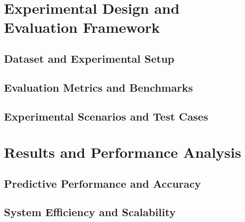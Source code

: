 \section{Experimental Design and Evaluation Framework}

\subsection{Dataset and Experimental Setup}

\subsection{Evaluation Metrics and Benchmarks}

\subsection{Experimental Scenarios and Test Cases}

\section{Results and Performance Analysis}

\subsection{Predictive Performance and Accuracy}

\subsection{System Efficiency and Scalability}

